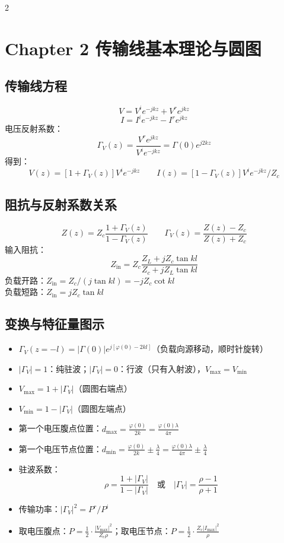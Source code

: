 \documentclass[10pt,a4paper,landscape]{article}
\begin{document}
\begin{multicols}{2}
\section{Chapter 2 传输线基本理论与圆图}
\subsection{传输线方程}
\[
V = V^i e^{-jkz} + V^r e^{jkz}
\]
\[
I = I^i e^{-jkz} - I^r e^{jkz}
\]
电压反射系数：
\[
\Gamma_V(z) = \frac{V^r e^{jkz}}{V^i e^{-jkz}} = \Gamma(0)e^{j2kz}
\]
得到：
\[
V(z) = [1 + \Gamma_V(z)]V^i e^{-jkz} \qquad I(z) = [1 - \Gamma_V(z)]V^i e^{-jkz} / Z_c
\]

\subsection{阻抗与反射系数关系}
\[
Z(z) = Z_c \frac{1 + \Gamma_V(z)}{1 - \Gamma_V(z)} \qquad \Gamma_V(z) = \frac{Z(z) - Z_c}{Z(z) + Z_c}
\]
输入阻抗：
\[
Z_{\text{in}} = Z_c \frac{Z_L + jZ_c \tan kl}{Z_c + jZ_L \tan kl}
\]
负载开路：$Z_{\text{in}} = Z_c / (j\tan kl) = -jZ_c \cot kl$ \\
负载短路：$Z_{\text{in}} = jZ_c \tan kl$

\subsection{变换与特征量图示}
\begin{itemize}
    \item $\Gamma_V(z=-l) = |\Gamma(0)|e^{j[\varphi(0)-2kl]}$（负载向源移动，顺时针旋转）
    \item $|\Gamma_V| = 1$：纯驻波；$|\Gamma_V| = 0$：行波（只有入射波），$V_{\max} = V_{\min}$
    \item $V_{\max} = 1 + |\Gamma_V|$（圆图右端点）
    \item $V_{\min} = 1 - |\Gamma_V|$（圆图左端点）
    \item 第一个电压腹点位置：$d_{\max} = \frac{\varphi(0)}{2k} = \frac{\varphi(0)\lambda}{4\pi}$
    \item 第一个电压节点位置：$d_{\min} = \frac{\varphi(0)}{2k} \pm \frac{\lambda}{4} = \frac{\varphi(0)\lambda}{4\pi} \pm \frac{\lambda}{4}$
    \item 驻波系数：
    \[
    \rho = \frac{1+|\Gamma_V|}{1-|\Gamma_V|} \quad \text{或} \quad |\Gamma_V| = \frac{\rho-1}{\rho+1}
    \]
    \item 传输功率：$|\Gamma_V|^2 = P^r / P^i$
    \item 取电压腹点：$P = \frac{1}{2}\cdot\frac{|V_{\max}|^2}{Z_c\rho}$；取电压节点：$P = \frac{1}{2}\cdot\frac{Z_c|I_{\max}|^2}{\rho}$
\end{itemize}


\end{multicols}
\end{document}
